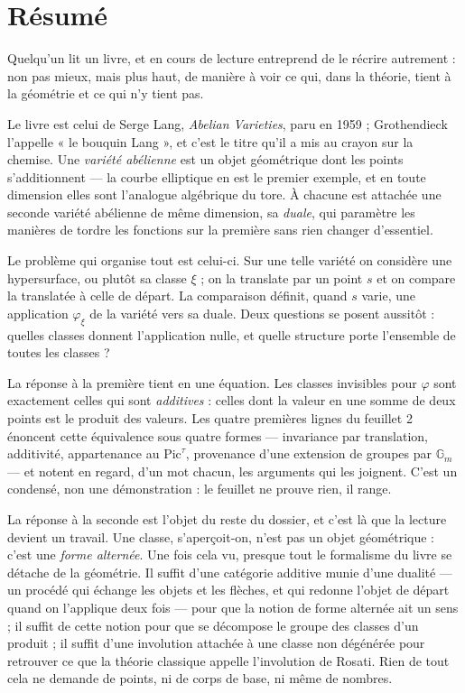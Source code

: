 \documentclass[11pt,a4paper]{article}
\begin{document}
\section*{Résumé}

\begin{resume}
Quelqu'un lit un livre, et en cours de lecture entreprend de le récrire
autrement : non pas mieux, mais plus haut, de manière à voir ce qui, dans la
théorie, tient à la géométrie et ce qui n'y tient pas.

Le livre est celui de Serge Lang, \emph{Abelian Varieties}, paru en 1959 ;
Grothendieck l'appelle « le bouquin Lang », et c'est le titre qu'il a mis au
crayon sur la chemise. Une \emph{variété abélienne} est un objet géométrique
dont les points s'additionnent — la courbe elliptique en est le premier
exemple, et en toute dimension elles sont l'analogue algébrique du tore. À
chacune est attachée une seconde variété abélienne de même dimension, sa
\emph{duale}, qui paramètre les manières de tordre les fonctions sur la
première sans rien changer d'essentiel.

Le problème qui organise tout est celui-ci. Sur une telle variété on considère
une hypersurface, ou plutôt sa classe $\xi$ ; on la translate par un point $s$
et on compare la translatée à celle de départ. La comparaison définit, quand
$s$ varie, une application $\varphi_{\xi}$ de la variété vers sa duale. Deux
questions se posent aussitôt : quelles classes donnent l'application nulle, et
quelle structure porte l'ensemble de toutes les classes ?

La réponse à la première tient en une équation. Les classes invisibles pour
$\varphi$ sont exactement celles qui sont \emph{additives} : celles dont la
valeur en une somme de deux points est le produit des valeurs. Les quatre
premières lignes du feuillet 2 énoncent cette équivalence sous quatre formes —
invariance par translation, additivité, appartenance au $\mathrm{Pic}^{\tau}$,
provenance d'une extension de groupes par $\mathbb{G}_m$ — et notent en regard,
d'un mot chacun, les arguments qui les joignent. C'est un condensé, non une
démonstration : le feuillet ne prouve rien, il range.

La réponse à la seconde est l'objet du reste du dossier, et c'est là que la
lecture devient un travail. Une classe, s'aperçoit-on, n'est pas un objet
géométrique : c'est une \emph{forme alternée}. Une fois cela vu, presque tout
le formalisme du livre se détache de la géométrie. Il suffit d'une catégorie
additive munie d'une dualité — un procédé qui échange les objets et les
flèches, et qui redonne l'objet de départ quand on l'applique deux fois — pour
que la notion de forme alternée ait un sens ; il suffit de cette notion pour
que se décompose le groupe des classes d'un produit ; il suffit d'une
involution attachée à une classe non dégénérée pour retrouver ce que la théorie
classique appelle l'involution de Rosati. Rien de tout cela ne demande de
points, ni de corps de base, ni même de nombres.


\end{resume}
\end{document}
